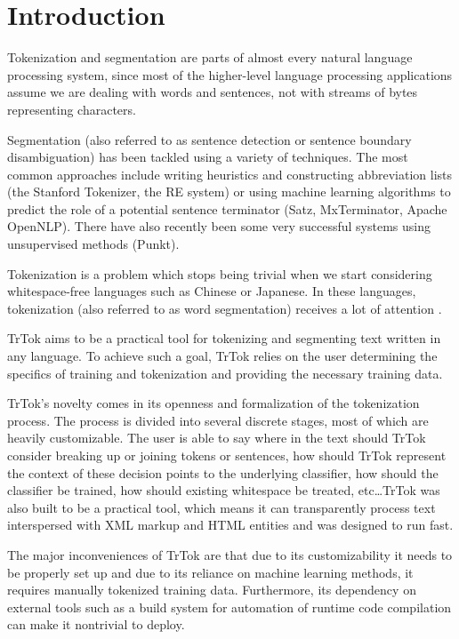 \section{Introduction}
\label{sec:introduction}

Tokenization and segmentation are parts of almost every natural
language processing system, since most of the higher-level language
processing applications assume we are dealing with words and
sentences, not with streams of bytes representing characters.


Segmentation (also referred to as sentence detection or sentence
boundary disambiguation) has been tackled using a variety of
techniques. The most common approaches include writing heuristics and
constructing abbreviation lists (the Stanford Tokenizer, the RE
system) or using machine learning algorithms to predict the role of a
potential sentence terminator (Satz, MxTerminator, Apache OpenNLP).
There have also recently been some very successful systems using
unsupervised methods (Punkt).

Tokenization is a problem which stops being trivial when we start
considering whitespace-free languages such as Chinese or Japanese. In
these languages, tokenization (also referred to as word segmentation)
receives a lot of attention \cite{seg-bakeoff}.

TrTok aims to be a practical tool for tokenizing and segmenting text
written in any language. To achieve such a goal, TrTok relies on the
user determining the specifics of training and tokenization and
providing the necessary training data.

TrTok's novelty comes in its openness and formalization of the
tokenization process. The process is divided into several discrete
stages, most of which are heavily customizable. The user is able to
say where in the text should TrTok consider breaking up or joining
tokens or sentences, how should TrTok represent the context of these
decision points to the underlying classifier, how should the
classifier be trained, how should existing whitespace be treated,
etc\ldots TrTok was also built to be a practical tool, which means it
can transparently process text interspersed with XML markup and HTML
entities and was designed to run fast.

The major inconveniences of TrTok are that due to its customizability
it needs to be properly set up and due to its reliance on machine
learning methods, it requires manually tokenized training data.
Furthermore, its dependency on external tools such as a build system
for automation of runtime code compilation can make it nontrivial to
deploy.
